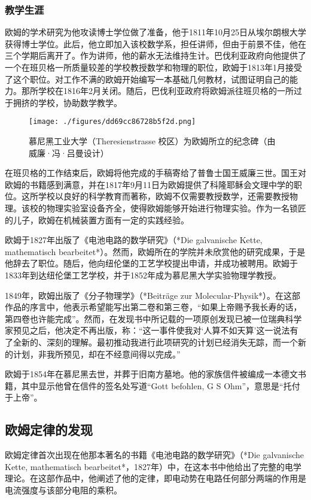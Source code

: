 \subsubsection{教学生涯} 
欧姆的学术研究为他攻读博士学位做了准备，他于1811年10月25日从埃尔朗根大学获得博士学位。此后，他立即加入该校数学系，担任讲师，但由于前景不佳，他在三个学期后离开了。作为讲师，他的薪水无法维持生计。巴伐利亚政府向他提供了一个在班贝格一所质量较差的学校教授数学和物理的职位，欧姆于1813年1月接受了这个职位。对工作不满的欧姆开始编写一本基础几何教材，试图证明自己的能力。那所学校在1816年2月关闭。随后，巴伐利亚政府将欧姆派往班贝格的一所过于拥挤的学校，协助数学教学。
\begin{figure}[ht]
\centering
\texttt{[image: ./figures/dd69cc86728b5f2d.png]}
\caption{慕尼黑工业大学（Theresienstrasse 校区）为欧姆所立的纪念碑（由威廉·冯·吕曼设计）} \label{fig_GOM_2}
\end{figure}
在班贝格的工作结束后，欧姆将他完成的手稿寄给了普鲁士国王威廉三世。国王对欧姆的书籍感到满意，并在1817年9月11日为欧姆提供了科隆耶稣会文理中学的职位。这所学校以良好的科学教育而著称，欧姆不仅需要教授数学，还需要教授物理。该校的物理实验室设备齐全，使得欧姆能够开始进行物理实验。作为一名锁匠的儿子，欧姆在机械装置方面有一定的实践经验。

欧姆于1827年出版了《电池电路的数学研究》（*Die galvanische Kette, mathematisch bearbeitet*）。然而，欧姆所在的学院并未欣赏他的研究成果，于是他辞去了职位。随后，他向纽伦堡的工艺学校提出申请，并成功被聘用。欧姆于1833年到达纽伦堡工艺学校，并于1852年成为慕尼黑大学实验物理学教授。

1849年，欧姆出版了《分子物理学》（*Beiträge zur Molecular-Physik*）。在这部作品的序言中，他表示希望能写出第二卷和第三卷，“如果上帝赐予我长寿的话，第四卷也许能完成”。然而，在发现书中所记载的一项原创发现已被一位瑞典科学家预见之后，他决定不再出版，称：“这一事件使我对‘人算不如天算’这一说法有了全新的、深刻的理解。最初推动我进行此项研究的计划已经消失无踪，而一个新的计划，非我所预见，却在不经意间得以完成。”

欧姆于1854年在慕尼黑去世，并葬于旧南方墓地。他的家族信件被编成一本德文书籍，其中显示他曾在信件的签名处写道“Gott befohlen, G S Ohm”，意思是“托付于上帝”。
\subsection{欧姆定律的发现}  
欧姆定律首次出现在他那本著名的书籍《电池电路的数学研究》（*Die galvanische Kette, mathematisch bearbeitet*，1827年）中，在这本书中他给出了完整的电学理论。在这部作品中，他阐述了他的定律，即电动势在电路任何部分两端的作用是电流强度与该部分电阻的乘积。


